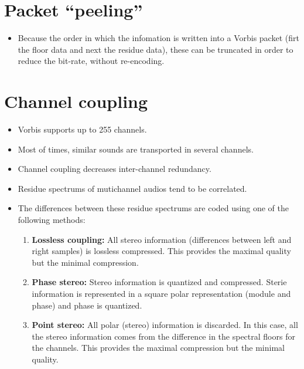 
\section{Packet ``peeling''}
\begin{itemize}
\item Because the order in which the infomation is written into a
  Vorbis packet (firt the floor data and next the residue data), these
  can be truncated in order to reduce the bit-rate, without
  re-encoding.
\end{itemize}

\section{Channel coupling}

\begin{itemize}
\item Vorbis supports up to 255 channels.
\item Most of times, similar sounds are transported in several
  channels.
\item Channel coupling decreases inter-channel redundancy.
\item Residue spectrums of mutichannel audios tend to be correlated.
\item The differences between these residue spectrums are coded using
  one of the following methods:
  \begin{enumerate}
  \item \textbf{Lossless coupling:} All stereo information
    (differences between left and right samples) is lossless
    compressed. This provides the maximal quality but the minimal
    compression.
  \item \textbf{Phase stereo:} Stereo information is quantized and
    compressed. Sterie information is represented in a square polar
    representation (module and phase) and phase is quantized.
  \item \textbf{Point stereo:} All polar (stereo) information is
    discarded. In this case, all the stereo information comes from the
    difference in the spectral floors for the channels. This provides
    the maximal compression but the minimal quality.
  \end{enumerate}
\end{itemize}

